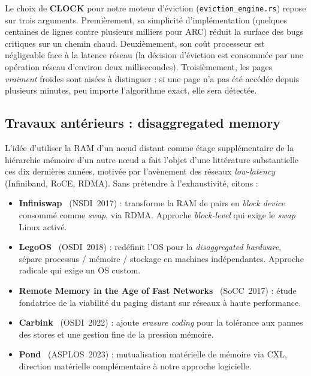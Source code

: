 Le choix de \textbf{CLOCK} pour notre moteur d'éviction (\texttt{eviction\_engine.rs}) repose sur trois arguments. Premièrement, sa simplicité d'implémentation (quelques centaines de lignes contre plusieurs milliers pour ARC) réduit la surface des bugs critiques sur un chemin chaud. Deuxièmement, son coût processeur est négligeable face à la latence réseau (la décision d'éviction est consommée par une opération réseau d'environ deux millisecondes). Troisièmement, les pages \emph{vraiment} froides sont aisées à distinguer : si une page n'a pas été accédée depuis plusieurs minutes, peu importe l'algorithme exact, elle sera détectée.

\subsection{Travaux antérieurs : disaggregated memory}

L'idée d'utiliser la RAM d'un nœud distant comme étage supplémentaire de la hiérarchie mémoire d'un autre nœud a fait l'objet d'une littérature substantielle ces dix dernières années, motivée par l'avènement des réseaux \emph{low-latency} (Infiniband, RoCE, RDMA). Sans prétendre à l'exhaustivité, citons :

\begin{itemize}[leftmargin=*]
    \item \textbf{Infiniswap}~\cite{gu_2017_infiniswap} (NSDI~2017) : transforme la RAM de pairs en \emph{block device} consommé comme \emph{swap}, via RDMA. Approche \emph{block-level} qui exige le \emph{swap} Linux activé.
    \item \textbf{LegoOS}~\cite{shan_2018_legoos} (OSDI~2018) : redéfinit l'OS pour la \emph{disaggregated hardware}, sépare processus / mémoire / stockage en machines indépendantes. Approche radicale qui exige un OS custom.
    \item \textbf{Remote Memory in the Age of Fast Networks}~\cite{aguilera_2017_remote_memory} (SoCC~2017) : étude fondatrice de la viabilité du paging distant sur réseaux à haute performance.
    \item \textbf{Carbink}~\cite{zhou_2022_carbink} (OSDI~2022) : ajoute \emph{erasure coding} pour la tolérance aux pannes des stores et une gestion fine de la pression mémoire.
    \item \textbf{Pond}~\cite{li_2023_pond} (ASPLOS~2023) : mutualisation matérielle de mémoire via CXL, direction matérielle complémentaire à notre approche logicielle.
\end{itemize}

